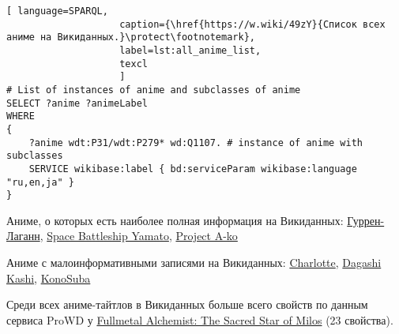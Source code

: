 \begin{lstlisting}[ language=SPARQL, 
                    caption={\href{https://w.wiki/49zY}{Список всех аниме на Викиданных.}\protect\footnotemark},
                    label=lst:all_anime_list,
                    texcl 
                    ]
# List of instances of anime and subclasses of anime
SELECT ?anime ?animeLabel
WHERE
{
    ?anime wdt:P31/wdt:P279* wd:Q1107. # instance of anime with subclasses
    SERVICE wikibase:label { bd:serviceParam wikibase:language "ru,en,ja" }
}
\end{lstlisting}%

Аниме, о которых есть наиболее полная информация на Викиданных: \href{https://www.wikidata.org/wiki/Q4277}{Гуррен-Лаганн}, \href{https://www.wikidata.org/wiki/Q4292}{Space Battleship Yamato}, \href{https://www.wikidata.org/wiki/Q4316}{Project A-ko}

Аниме с малоинформативными записями на Викиданных: \href{https://www.wikidata.org/wiki/Q18692527}{Charlotte}, \href{https://www.wikidata.org/wiki/Q20043638}{Dagashi Kashi}, \href{https://www.wikidata.org/wiki/Q19750843}{KonoSuba}

Среди всех аниме-тайтлов в Викиданных больше всего свойств по данным сервиса ProWD у \href{https://www.wikidata.org/wiki/Q1004318}{Fullmetal Alchemist: The Sacred Star of Milos} (23 свойства).

